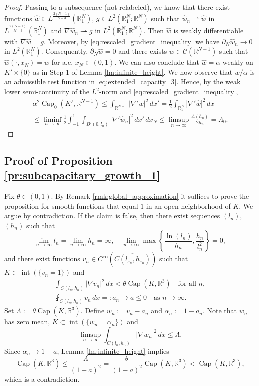 \documentclass{article}
\numberwithin{equation}{section}
\theoremstyle{definition}
\theoremstyle{remark}
\newcommand{\cpct}{\operatorname{Cap}}
\newcommand{\topint}{\operatorname{int}}
\begin{document}
\begin{proof}
    Passing to a subsequence (not relabeled), we know that there exist functions $\hat{w} \in L^\frac{2(N - 1)}{N - 3}(\mathbb{R}_1^N)$, $g \in L^2(\mathbb{R}_1^N; \mathbb{R}^N)$ such that $\hat{w}_n \rightharpoonup \hat{w}$ in $L^\frac{2(N - 1)}{N - 3}(\mathbb{R}_1^N)$ and $\nabla \hat{w}_n \rightharpoonup g$ in $L^2(\mathbb{R}_1^N; \mathbb{R}^N)$. Then $\hat{w}$ is weakly differentiable with $\nabla \hat{w} = g$. Moreover, by \eqref{eq:rescaled_gradient_inequality} we have $\partial_N \hat{w}_n \to 0$ in $L^2(\mathbb{R}_1^N)$. Consequently, $\partial_N \hat{w} = 0$ and there exists $w \in \mathcal{C}(\mathbb{R}^{N - 1})$ such that $\hat{w}(\cdot, x_N) = w$ for a.e. $x_N \in (0, 1)$. We can also conclude that $\hat{w} = \alpha$ weakly on $K' \times \{0\}$ as in Step 1 of Lemma \ref{lm:infinite_height}. We now observe that $w/\alpha$ is an admissible test function in \eqref{eq:extended_capacity_3}. Hence, by the weak lower semi-continuity of the $L^2$-norm and \eqref{eq:rescaled_gradient_inequality},
    \begin{multline}
        \alpha^2 \cpct_0(K', \mathbb{R}^{N - 1}) \le \int_{\mathbb{R}^{N - 1}} |\nabla' w|^2 \, dx' = \frac{1}{2} \int_{\mathbb{R}_1^N} |\nabla' \hat{w}|^2 \, dx \\
        \le \liminf_{n \to \infty} \frac{1}{2} \int_{-1}^1 \int_{B'(0, l_n)} |\nabla' \hat{w}_n|^2 \, dx' \, dx_N \le \limsup_{n \to \infty} \frac{\Lambda(h_n)}{2h_n} = \Lambda_0.
    \end{multline}
\end{proof}

\subsection{Proof of Proposition \ref{pr:subcapacitary_growth_1}}

Fix $\theta \in (0, 1)$. By Remark \ref{rmk:global_approximation} it suffices to prove the proposition for smooth functions that equal $1$ in an open neighborhood of $K$. We argue by contradiction. If the claim is false, then there exist sequences $(l_n)$, $(h_n)$ such that
\[
\lim_{n \to \infty} l_n = \lim_{n \to \infty} h_n = \infty, \quad \lim_{n \to \infty} \max \left\{\frac{\ln(l_n)}{h_n}, \frac{h_n}{l_n^2} \right\} = 0,
\]
and there exist functions $v_n \in C^\infty(\overline{C(l_{\varepsilon_n}, h_{\varepsilon_n})})$ such that $K \subset \topint(\{v_n = 1\})$ and
\begin{gather*}
    \int_{C(l_n, h_n)} |\nabla v_n|^2 \, dx < \theta \cpct(K, \mathbb{R}^3) \quad \text{for all } n, \\
    \fint_{C(l_n, h_n)} v_n \, dx =: a_n \to a \le 0 \quad \text{as } n \to \infty.
\end{gather*}
Set $\Lambda := \theta \cpct(K, \mathbb{R}^3)$. Define $w_n := v_n - a_n$ and $\alpha_n := 1 - a_n$. Note that $w_n$ has zero mean, $K \subset \topint(\{w_n = \alpha_n\})$ and
\[
\limsup_{n \to \infty} \int_{C(l_n, h_n)} |\nabla w_n|^2 \, dx \le \Lambda.
\]
Since $\alpha_n \to 1 - a$, Lemma \ref{lm:infinite_height} implies
\[
\cpct(K, \mathbb{R}^3) \le \frac{\Lambda}{(1 - a)^2} = \frac{\theta}{(1 - a)^2} \cpct(K, \mathbb{R}^3) < \cpct(K, \mathbb{R}^3),
\]
which is a contradiction.
\end{document}
